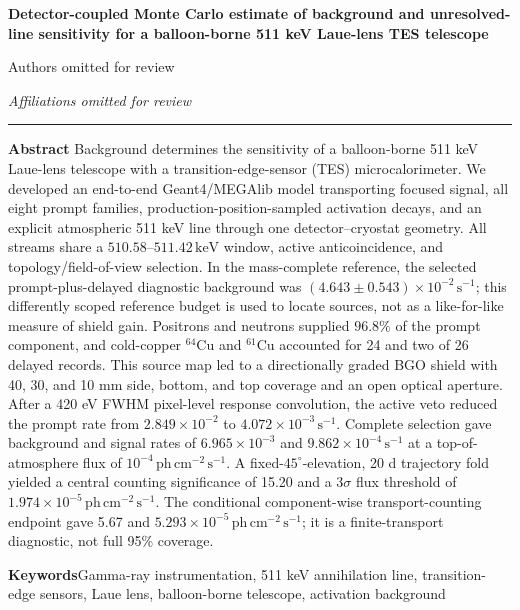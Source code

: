 \documentclass[11pt]{article}
\newcommand{\keV}{\ensuremath{\,\mathrm{keV}}}
\newcommand{\phcms}{\ensuremath{\,\mathrm{ph\,cm^{-2}\,s^{-1}}}}
\newcommand{\cps}{\ensuremath{\,\mathrm{s^{-1}}}}
\begin{document}
\thispagestyle{fancy}
\begin{flushleft}
{\LARGE\bfseries Detector-coupled Monte Carlo estimate of background and unresolved-line sensitivity for a balloon-borne 511 keV Laue-lens TES telescope\par}
\vspace{1.1em}
{\large Authors omitted for review\par}
\vspace{0.3em}
{\normalsize\itshape Affiliations omitted for review\par}
\end{flushleft}
\vspace{0.7em}
\noindent\rule{\textwidth}{0.4pt}
\vspace{0.5em}

\noindent\textbf{Abstract}\hspace{0.7em}
Background determines the sensitivity of a balloon-borne 511 keV Laue-lens
telescope with a transition-edge-sensor (TES) microcalorimeter. We developed an
end-to-end Geant4/MEGAlib model transporting focused signal, all eight prompt
families, production-position-sampled activation decays, and an explicit
atmospheric 511 keV line through one detector--cryostat geometry. All streams
share a $510.58$--$511.42\keV$ window, active anticoincidence, and
topology/field-of-view selection. In the mass-complete reference, the selected
prompt-plus-delayed diagnostic background was $(4.643\pm0.543)\times10^{-2}\cps$;
this differently scoped reference budget is used to locate sources, not as a
like-for-like measure of shield gain. Positrons and neutrons supplied
$96.8\%$ of the prompt component, and cold-copper $^{64}$Cu and $^{61}$Cu
accounted for 24 and two of 26 delayed records. This source map led to a
directionally graded BGO shield with 40, 30, and 10 mm side, bottom, and top
coverage and an open optical aperture. After a 420 eV FWHM pixel-level response
convolution, the active veto reduced the prompt rate from
$2.849\times10^{-2}$ to $4.072\times10^{-3}\cps$. Complete selection gave
background and signal rates of $6.965\times10^{-3}$ and
$9.862\times10^{-4}\cps$ at a top-of-atmosphere flux of $10^{-4}\phcms$. A
fixed-$45^\circ$-elevation, 20 d trajectory fold yielded a central counting
significance of 15.20 and a $3\sigma$ flux threshold of
$1.974\times10^{-5}\phcms$. The conditional component-wise transport-counting
endpoint gave 5.67 and $5.293\times10^{-5}\phcms$; it is a finite-transport
diagnostic, not full 95\% coverage.

\vspace{0.7em}
\noindent\textbf{Keywords}\hspace{0.7em}Gamma-ray instrumentation, 511 keV annihilation line, transition-edge sensors, Laue lens, balloon-borne telescope, activation background
\end{document}
